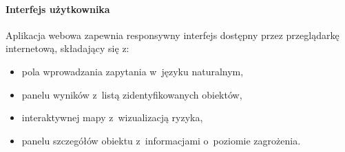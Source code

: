 \paragraph{Interfejs użytkownika}
Aplikacja webowa zapewnia responsywny interfejs dostępny przez przeglądarkę internetową, składający się z:
\begin{itemize}
    \item pola wprowadzania zapytania w~języku naturalnym,
    \item panelu wyników z~listą zidentyfikowanych obiektów,
    \item interaktywnej mapy z~wizualizacją ryzyka,
    \item panelu szczegółów obiektu z~informacjami o~poziomie zagrożenia.
\end{itemize}

